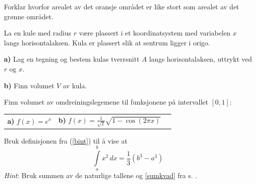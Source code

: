 Forklar hvorfor arealet av det oransje området er like stort som arealet av det grønne området.

\nes
{}
La en kule med radius $ r $ være plassert i et koordinatsystem med variabelen $ x $ langs horisontalaksen. Kula er plassert slik at sentrum ligger i origo.\os

\textbf{a)} Lag en tegning og bestem kulas tverrsnitt $ A $ langs horisontalaksen, uttrykt ved $ r $ og $ x $.\os

\textbf{b)} Finn volumet $ V $ av kula.

Finn volumet av omdreiningslegemene til funksjonene på intervallet $ [0, 1] $:\os

\begin{tabular}{@{}l l l}	
	\textbf{a)} $ f(x)=e^x  $&\quad\textbf{b)} $\displaystyle f(x)= \frac{1}{\sqrt{2}}\sqrt{1-\cos(2 \pi x)}$ &\quad
\end{tabular}

\ekspop
Bruk definisjonen fra (\ref{bint}) til å vise at
\[ \int\limits_a^b x^2 \,dx = \frac{1}{3}(b^3-a^3) \]
\textsl{Hint}: Bruk summen av de naturlige tallene og \eqref{sumkvad} fra s. \pageref{sumkvad}.

